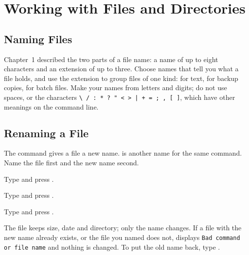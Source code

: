 \chapter{Working with Files and Directories}

\section{Naming Files}
Chapter~1 described the two parts of a file name: a name of up to eight
characters and an extension of up to three.  Choose names that tell you
what a file holds, and use the extension to group files of one kind:
 for text,  for backup copies,  for batch
files.  Make your names from letters and digits; do not use spaces, or the
characters \texttt{\textbackslash{} / : * ? " < > | + = ; , [ ]}, which have
other meanings on the command line.

\section{Renaming a File}
The  command gives a file a new name.   is another
name for the same command.  Name the file first and the new name second.
\begin{Steps}
\item Type  and press .
\item Type  and press .
\item Type  and press .
\end{Steps}


The file keeps  size, date and directory; only the name changes.  If a
file with the new name already exists, or the file you named does not,
 displays \texttt{Bad command or file name} and nothing is
changed.  To put the old name back, type .


